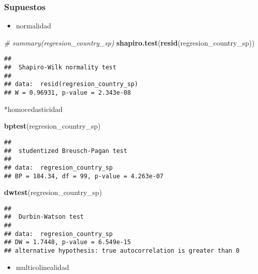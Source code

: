 \documentclass[
]{article}
\newenvironment{Shaded}{\begin{snugshade}}{\end{snugshade}}
\newcommand{\CommentTok}[1]{\textcolor[rgb]{0.56,0.35,0.01}{\textit{#1}}}
\newcommand{\FunctionTok}[1]{\textcolor[rgb]{0.13,0.29,0.53}{\textbf{#1}}}
\newcommand{\NormalTok}[1]{#1}
\providecommand{\tightlist}{%
  \setlength{\itemsep}{0pt}\setlength{\parskip}{0pt}}
\begin{document}
\subsubsection{Supuestos}\label{supuestos}

\begin{itemize}
\tightlist
\item
  normalidad
\end{itemize}

\begin{Shaded}
\begin{Highlighting}[]
\CommentTok{\# summary(regresion\_country\_sp)}
\FunctionTok{shapiro.test}\NormalTok{(}\FunctionTok{resid}\NormalTok{(regresion\_country\_sp))}
\end{Highlighting}
\end{Shaded}

\begin{verbatim}
## 
##  Shapiro-Wilk normality test
## 
## data:  resid(regresion_country_sp)
## W = 0.96931, p-value = 2.343e-08
\end{verbatim}

*homocedasticidad

\begin{Shaded}
\begin{Highlighting}[]
\FunctionTok{bptest}\NormalTok{(regresion\_country\_sp)}
\end{Highlighting}
\end{Shaded}

\begin{verbatim}
## 
##  studentized Breusch-Pagan test
## 
## data:  regresion_country_sp
## BP = 184.34, df = 99, p-value = 4.263e-07
\end{verbatim}

\begin{Shaded}
\begin{Highlighting}[]
\FunctionTok{dwtest}\NormalTok{(regresion\_country\_sp)}
\end{Highlighting}
\end{Shaded}

\begin{verbatim}
## 
##  Durbin-Watson test
## 
## data:  regresion_country_sp
## DW = 1.7448, p-value = 6.549e-15
## alternative hypothesis: true autocorrelation is greater than 0
\end{verbatim}

\begin{itemize}
\tightlist
\item
  multicolinealidad
\end{itemize}
\end{document}
